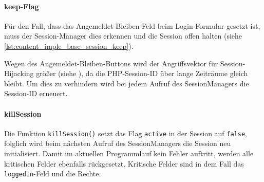 \paragraph{keep-Flag\\}
Für den Fall, dass das Angemeldet-Bleiben-Feld beim Login-Formular gesetzt ist, muss der Session-Manager dies erkennen und die Session offen halten (siehe \autoref{lst:content_imple_base_session_keep}).


Wegen des Angemeldet-Bleiben-Buttons wird der Angriffsvektor für Session-Hijacking größer (siehe ), da die PHP-Session-ID über lange Zeiträume gleich bleibt. Um dies zu verhindern wird bei jedem Aufruf des SessionManagers die Session-ID erneuert.


\paragraph{killSession\\}
Die Funktion \texttt{killSession()} setzt das Flag \texttt{active} in der Session auf \texttt{false}, folglich wird beim nächsten Aufruf des SessionManagers die Session neu initialisiert. Damit im aktuellen Programmlauf kein Fehler auftritt, werden alle kritischen Felder ebenfalls rückgesetzt. Kritische Felder sind in dem Fall das \texttt{loggedIn}-Feld und die Rechte.


